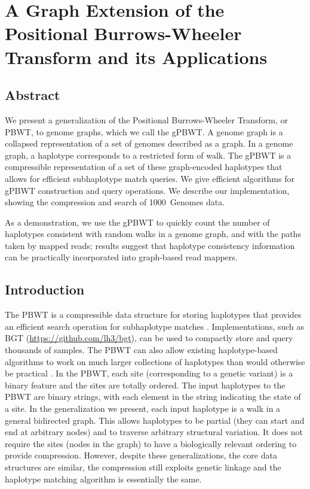 \chapter{A Graph Extension of the Positional Burrows-Wheeler Transform and its Applications}

\section{Abstract}
We present a generalization of the Positional Burrows-Wheeler Transform, or PBWT, to genome graphs, which we call the gPBWT. A genome graph is a collapsed representation of a set of genomes described as a graph. In a genome graph, a haplotype corresponds to a restricted form of walk. The gPBWT is a compressible representation of a set of these graph-encoded haplotypes that allows for efficient subhaplotype match queries. We give efficient algorithms for gPBWT construction and query operations. We describe our implementation, showing the compression and search of 1000~Genomes data.

As a demonstration, we use the gPBWT to quickly count the number of haplotypes consistent with random walks in a genome graph, and with the paths taken by mapped reads; results suggest that haplotype consistency information can be practically incorporated into graph-based read mappers. 

\section{Introduction}

The PBWT is a compressible data structure for storing haplotypes that provides an efficient search operation for subhaplotype matches \cite{durbin2014efficient}. Implementations, such as BGT (\url{https://github.com/lh3/bgt}), can be used to compactly store and query thousands of samples. The PBWT can also allow existing haplotype-based algorithms to work on much larger collections of haplotypes than would otherwise be practical \cite{lunter2016fast}. In the PBWT, each site (corresponding to a genetic variant) is a binary feature and the sites are totally ordered. The input haplotypes to the PBWT are binary strings, with each element in the string indicating the state of a site. In the generalization we present, each input haplotype is a walk in a general bidirected graph. This allows haplotypes to be partial (they can start and end at arbitrary nodes) and to traverse arbitrary structural variation. It does not require the sites (nodes in the graph) to have a biologically relevant ordering to provide compression.
However, despite these generalizations, the core data structures are similar, the compression still exploits genetic linkage and the haplotype matching algorithm is essentially the same.

